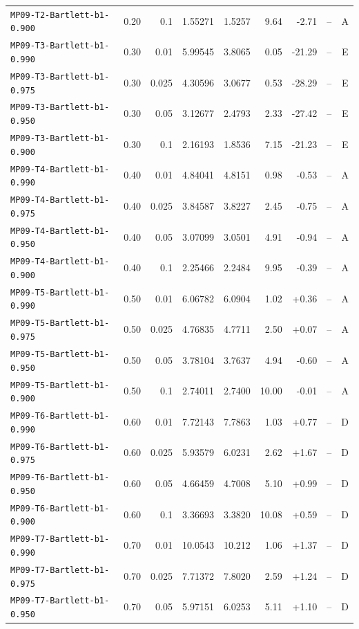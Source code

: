 \begin{longtable}{@{}lrrrrrrrc@{}}
\texttt{MP09-T2-Bartlett-b1-0.900} & 0.20 & 0.1 & 1.55271 & 1.5257 & 9.64 & -2.71 & -- & A\\
\texttt{MP09-T3-Bartlett-b1-0.990} & 0.30 & 0.01 & 5.99545 & 3.8065 & 0.05 & -21.29 & -- & E\\
\texttt{MP09-T3-Bartlett-b1-0.975} & 0.30 & 0.025 & 4.30596 & 3.0677 & 0.53 & -28.29 & -- & E\\
\texttt{MP09-T3-Bartlett-b1-0.950} & 0.30 & 0.05 & 3.12677 & 2.4793 & 2.33 & -27.42 & -- & E\\
\texttt{MP09-T3-Bartlett-b1-0.900} & 0.30 & 0.1 & 2.16193 & 1.8536 & 7.15 & -21.23 & -- & E\\
\texttt{MP09-T4-Bartlett-b1-0.990} & 0.40 & 0.01 & 4.84041 & 4.8151 & 0.98 & -0.53 & -- & A\\
\texttt{MP09-T4-Bartlett-b1-0.975} & 0.40 & 0.025 & 3.84587 & 3.8227 & 2.45 & -0.75 & -- & A\\
\texttt{MP09-T4-Bartlett-b1-0.950} & 0.40 & 0.05 & 3.07099 & 3.0501 & 4.91 & -0.94 & -- & A\\
\texttt{MP09-T4-Bartlett-b1-0.900} & 0.40 & 0.1 & 2.25466 & 2.2484 & 9.95 & -0.39 & -- & A\\
\texttt{MP09-T5-Bartlett-b1-0.990} & 0.50 & 0.01 & 6.06782 & 6.0904 & 1.02 & +0.36 & -- & A\\
\texttt{MP09-T5-Bartlett-b1-0.975} & 0.50 & 0.025 & 4.76835 & 4.7711 & 2.50 & +0.07 & -- & A\\
\texttt{MP09-T5-Bartlett-b1-0.950} & 0.50 & 0.05 & 3.78104 & 3.7637 & 4.94 & -0.60 & -- & A\\
\texttt{MP09-T5-Bartlett-b1-0.900} & 0.50 & 0.1 & 2.74011 & 2.7400 & 10.00 & -0.01 & -- & A\\
\texttt{MP09-T6-Bartlett-b1-0.990} & 0.60 & 0.01 & 7.72143 & 7.7863 & 1.03 & +0.77 & -- & D\\
\texttt{MP09-T6-Bartlett-b1-0.975} & 0.60 & 0.025 & 5.93579 & 6.0231 & 2.62 & +1.67 & -- & D\\
\texttt{MP09-T6-Bartlett-b1-0.950} & 0.60 & 0.05 & 4.66459 & 4.7008 & 5.10 & +0.99 & -- & D\\
\texttt{MP09-T6-Bartlett-b1-0.900} & 0.60 & 0.1 & 3.36693 & 3.3820 & 10.08 & +0.59 & -- & D\\
\texttt{MP09-T7-Bartlett-b1-0.990} & 0.70 & 0.01 & 10.0543 & 10.212 & 1.06 & +1.37 & -- & D\\
\texttt{MP09-T7-Bartlett-b1-0.975} & 0.70 & 0.025 & 7.71372 & 7.8020 & 2.59 & +1.24 & -- & D\\
\texttt{MP09-T7-Bartlett-b1-0.950} & 0.70 & 0.05 & 5.97151 & 6.0253 & 5.11 & +1.10 & -- & D\\

\end{longtable}
